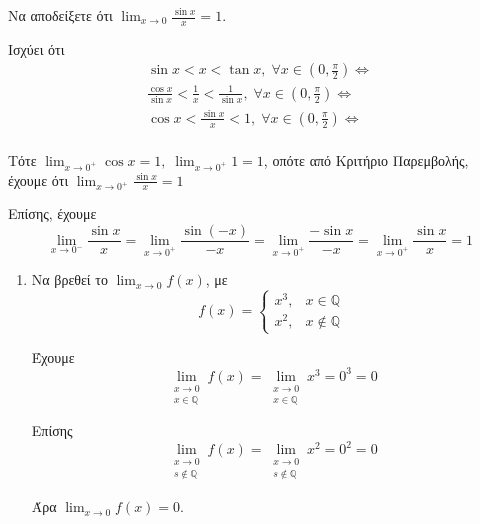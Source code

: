 \documentclass[main.tex]{subfiles}
\begin{document}
\begin{prop}
    Να αποδείξετε ότι $ \lim_{x \to 0} \frac{\sin{x}}{x} = 1 $.
\end{prop}

\begin{prop}
    Ισχύει ότι 
    \begin{align*}
        \sin{x} < x < \tan{x}, \; \forall x \in \left(0, \frac{\pi}{2}\right) 
        \Leftrightarrow \\
        \frac{\cos{x}}{\sin{x}} < \frac{1}{x} < \frac{1}{\sin{x}}, \; \forall x \in 
        \left(0, \frac{\pi}{2}\right) \Leftrightarrow \\
        \cos{x} < \frac{\sin{x}}{x} < 1, \; \forall x \in \left(0, \frac{\pi}{2}\right) 
        \Leftrightarrow \\
    \end{align*} 

    Τότε $ \lim_{x \to 0^{+}} \cos{x} = 1, \; \lim_{x \to 0^{+}} 1 = 1 $, 
    οπότε από Κριτήριο Παρεμβολής, έχουμε ότι 
    $ \lim_{x \to 0^{+}} \frac{\sin{x}}{x} = 1$

    Επίσης, έχουμε
    \[
        \lim_{x \to 0^{-}} \frac{\sin{x}}{x} = \lim_{x \to 0^{+}} 
        \frac{\sin{(-x)}}{-x} = \lim_{x \to 0^{+}} \frac{- \sin{x}}{-x} = 
        \lim_{x \to 0^{+}} \frac{\sin{x}}{x} = 1 
    \] 
\end{prop}

\begin{examples}
\item {}
    \begin{enumerate}
        \item Να βρεθεί το $ \lim_{x \to 0} f(x) $, με 
            \[
                f(x) = 
                \begin{cases} 
                    x^{3}, & x \in \mathbb{Q} \\
                    x^{2}, & x\not \in \mathbb{Q} 
                \end{cases} 
            \] 

            Έχουμε 
            \[
                \lim_{\substack{x \to 0 \\ x \in \mathbb{Q}}} f(x) = 
                \lim_{\substack{x \to 0 \\ x \in \mathbb{Q}}} x^{3} = 0^{3} = 0 
            \] 

            Επίσης
\[
    \lim_{\substack{x \to 0 \\ s \not \in \mathbb{Q}}} f(x) =  
    \lim_{\substack{x \to 0 \\ s \not \in \mathbb{Q}}} x^{2} = 0^{2} = 0
 \] 

 Άρα $ \lim_{x \to 0} f(x) = 0 $.

    \end{enumerate}
\end{examples}
\end{document}

